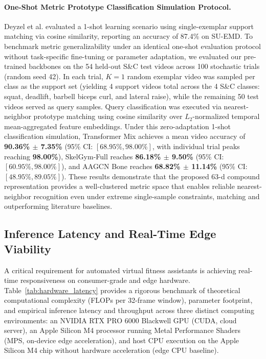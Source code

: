 \documentclass[preprint,12pt]{elsarticle}
\begin{document}
\paragraph{One-Shot Metric Prototype Classification Simulation Protocol.}
Deyzel et al. \cite{deyzel2023} evaluated a 1-shot learning scenario using single-exemplar support matching via cosine similarity, reporting an accuracy of 87.4\% on SU-EMD. To benchmark metric generalizability under an identical one-shot evaluation protocol without task-specific fine-tuning or parameter adaptation, we evaluated our pre-trained backbones on the 54 held-out S\&C test videos across 100 stochastic trials (random seed 42). In each trial, $K=1$ random exemplar video was sampled per class as the support set (yielding 4 support videos total across the 4 S\&C classes: squat, deadlift, barbell biceps curl, and lateral raise), while the remaining 50 test videos served as query samples. Query classification was executed via nearest-neighbor prototype matching using cosine similarity over $L_2$-normalized temporal mean-aggregated feature embeddings. Under this zero-adaptation 1-shot classification simulation, Transformer Mix achieves a mean video accuracy of \textbf{90.36\% $\pm$ 7.35\%} (95\% CI: $[68.95\%, 98.00\%]$, with individual trial peaks reaching \textbf{98.00\%}), SkelGym-Full reaches \textbf{86.18\% $\pm$ 9.50\%} (95\% CI: $[60.95\%, 98.00\%]$), and AAGCN Bone reaches \textbf{68.82\% $\pm$ 11.14\%} (95\% CI: $[48.95\%, 89.05\%]$). These results demonstrate that the proposed 63-d compound representation provides a well-clustered metric space that enables reliable nearest-neighbor recognition even under extreme single-sample constraints, matching and outperforming literature baselines.

\subsection{Inference Latency and Real-Time Edge Viability}
\label{sec:latency}

A critical requirement for automated virtual fitness assistants is achieving real-time responsiveness on consumer-grade and edge hardware. Table~\ref{tab:hardware_latency} provides a rigorous benchmark of theoretical computational complexity (FLOPs per 32-frame window), parameter footprint, and empirical inference latency and throughput across three distinct computing environments: an NVIDIA RTX PRO 6000 Blackwell GPU (CUDA, cloud server), an Apple Silicon M4 processor running Metal Performance Shaders (MPS, on-device edge acceleration), and host CPU execution on the Apple Silicon M4 chip without hardware acceleration (edge CPU baseline).
\end{document}
